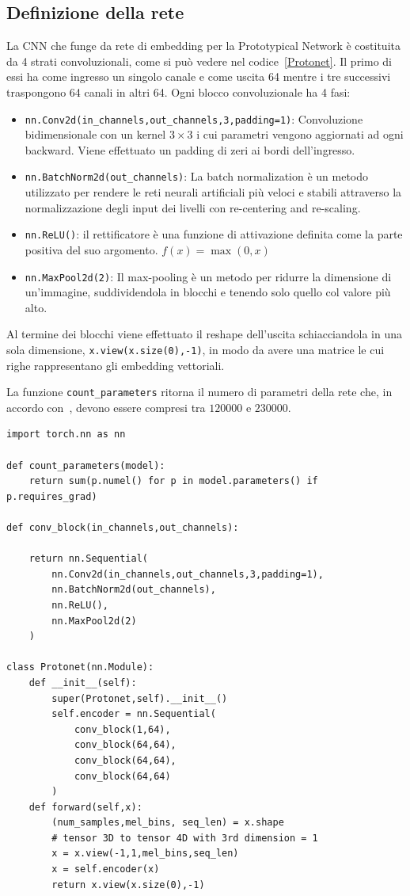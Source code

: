 \documentclass[12pt,a4paper,titlepage]{article}
\begin{document}
\subsection{Definizione della rete}
\label{subsec:definizione_protonet}
La CNN che funge da rete di embedding per la Prototypical Network è costituita da 4 strati convoluzionali, come si può vedere nel codice~\ref{Protonet}. Il primo di essi ha come ingresso un singolo canale e come uscita 64 mentre i tre successivi traspongono 64 canali in altri 64.
Ogni blocco convoluzionale ha 4 fasi:
\begin{itemize}
	\item \texttt{nn.Conv2d(in\_channels,out\_channels,3,padding=1)}: Convoluzione bidimensionale con un kernel $3\times3$ i cui parametri vengono aggiornati ad ogni backward. Viene effettuato un padding di zeri ai bordi dell'ingresso.
	\item \texttt{nn.BatchNorm2d(out\_channels)}: La batch normalization è un metodo utilizzato per rendere le reti neurali artificiali più veloci e stabili attraverso la normalizzazione degli input dei livelli con re-centering and re-scaling.
	\item \texttt{nn.ReLU()}: il rettificatore è una funzione di attivazione definita come la parte positiva del suo argomento. $f(x)=\max(0,x)$
	\item \texttt{nn.MaxPool2d(2)}: Il max-pooling è un metodo per ridurre la dimensione di un’immagine, suddividendola in blocchi e tenendo solo quello col valore più alto.
\end{itemize}
Al termine dei blocchi viene effettuato il reshape dell'uscita schiacciandola in una sola dimensione, \texttt{x.view(x.size(0),-1)}, in modo da avere una matrice le cui righe rappresentano gli embedding vettoriali.

La funzione \texttt{count\_parameters} ritorna il numero di parametri della rete che, in accordo con~\cite{Salamon:Few-Shot}, devono essere compresi tra $120000$ e $230000$.

\begin{lstlisting}[language=iPython,firstnumber=1, caption=protonet.py, label= Protonet,captionpos=b]
import torch.nn as nn

def count_parameters(model):
    return sum(p.numel() for p in model.parameters() if p.requires_grad)

def conv_block(in_channels,out_channels):

    return nn.Sequential(
        nn.Conv2d(in_channels,out_channels,3,padding=1),
        nn.BatchNorm2d(out_channels),
        nn.ReLU(),
        nn.MaxPool2d(2)
    )

class Protonet(nn.Module):
    def __init__(self):
        super(Protonet,self).__init__()
        self.encoder = nn.Sequential(
            conv_block(1,64),
            conv_block(64,64),
            conv_block(64,64),
            conv_block(64,64)
        )
    def forward(self,x):
        (num_samples,mel_bins, seq_len) = x.shape
        # tensor 3D to tensor 4D with 3rd dimension = 1
        x = x.view(-1,1,mel_bins,seq_len) 
        x = self.encoder(x)
        return x.view(x.size(0),-1)
\end{lstlisting}
\end{document}
